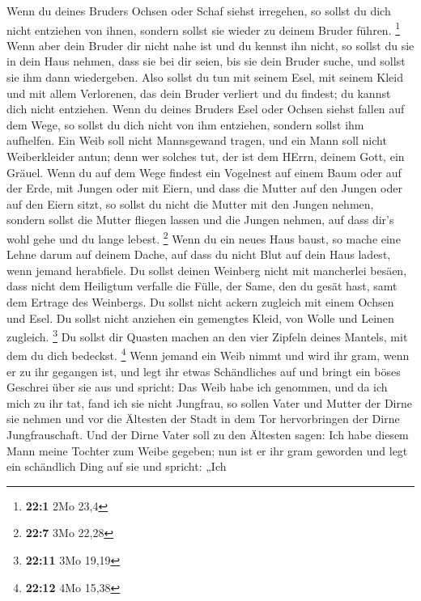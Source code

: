  Wenn du deines Bruders Ochsen oder Schaf siehst
irregehen, so sollst du dich nicht entziehen von ihnen, sondern sollst
sie wieder zu deinem Bruder führen. \footnote{\textbf{22:1} 2Mo 23,4}
 Wenn aber dein Bruder dir nicht nahe ist und du kennst
ihn nicht, so sollst du sie in dein Haus nehmen, dass sie bei dir seien,
bis sie dein Bruder suche, und sollst sie ihm dann wiedergeben.
 Also sollst du tun mit seinem Esel, mit seinem Kleid und
mit allem Verlorenen, das dein Bruder verliert und du findest; du kannst
dich nicht entziehen.  Wenn du deines Bruders Esel oder
Ochsen siehst fallen auf dem Wege, so sollst du dich nicht von ihm
entziehen, sondern sollst ihm aufhelfen.  Ein Weib soll
nicht Mannsgewand tragen, und ein Mann soll nicht Weiberkleider antun;
denn wer solches tut, der ist dem HErrn, deinem Gott, ein Gräuel.
 Wenn du auf dem Wege findest ein Vogelnest auf einem Baum
oder auf der Erde, mit Jungen oder mit Eiern, und dass die Mutter auf
den Jungen oder auf den Eiern sitzt, so sollst du nicht die Mutter mit
den Jungen nehmen,  sondern sollst die Mutter fliegen
lassen und die Jungen nehmen, auf dass dir's wohl gehe und du lange
lebest. \footnote{\textbf{22:7} 3Mo 22,28}  Wenn du ein
neues Haus baust, so mache eine Lehne darum auf deinem Dache, auf dass
du nicht Blut auf dein Haus ladest, wenn jemand herabfiele.
 Du sollst deinen Weinberg nicht mit mancherlei besäen,
dass nicht dem Heiligtum verfalle die Fülle, der Same, den du gesät
hast, samt dem Ertrage des Weinbergs.  Du sollst nicht
ackern zugleich mit einem Ochsen und Esel.  Du sollst
nicht anziehen ein gemengtes Kleid, von Wolle und Leinen zugleich.
\footnote{\textbf{22:11} 3Mo 19,19}  Du sollst dir
Quasten machen an den vier Zipfeln deines Mantels, mit dem du dich
bedeckst. \footnote{\textbf{22:12} 4Mo 15,38}  Wenn
jemand ein Weib nimmt und wird ihr gram, wenn er zu ihr gegangen ist,
 und legt ihr etwas Schändliches auf und bringt ein böses
Geschrei über sie aus und spricht: Das Weib habe ich genommen, und da
ich mich zu ihr tat, fand ich sie nicht Jungfrau,  so
sollen Vater und Mutter der Dirne sie nehmen und vor die Ältesten der
Stadt in dem Tor hervorbringen der Dirne Jungfrauschaft. 
Und der Dirne Vater soll zu den Ältesten sagen: Ich habe diesem Mann
meine Tochter zum Weibe gegeben; nun ist er ihr gram geworden
 und legt ein schändlich Ding auf sie und spricht: „Ich
